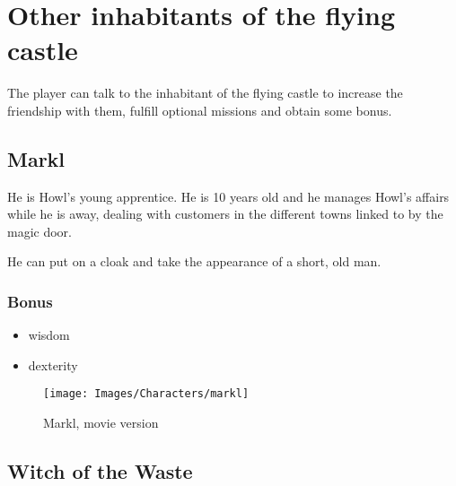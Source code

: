 \section{Other inhabitants of the flying castle}

The player can talk to the inhabitant of the flying castle to increase the friendship with them, fulfill optional missions and obtain some bonus.

\subsection{Markl}

\begin{minipage}{0.5\textwidth}
He is Howl’s young apprentice. He is 10 years old and he manages Howl's affairs while he is away, dealing with customers in the different towns linked to by the magic door.

He can put on a cloak and take the appearance of a short, old man.

\subsubsection{Bonus}
\begin{itemize}
	\item wisdom
	\item dexterity
\end{itemize}

\end{minipage}%
%
\hfill\begin{minipage}{0.4\textwidth}
  \begin{figure}[H]
    \hfill\texttt{[image: Images/Characters/markl]}
    \caption{Markl, movie version}
  \end{figure}
\end{minipage}

\subsection{Witch of the Waste}

